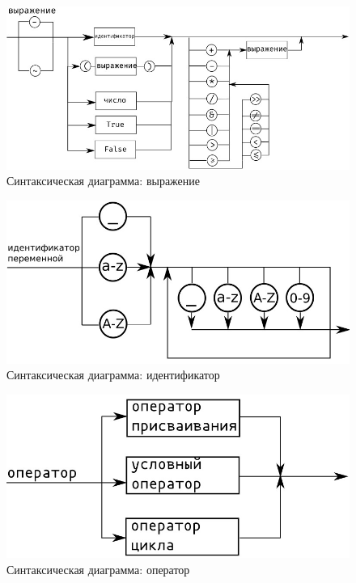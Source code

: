     \begin{figure}[h]
	\begin{center}
		\includegraphics[scale=0.9]{my_folder/images/virth/expr}
		\caption{Синтаксическая диаграмма: выражение}
	\end{center}
    \end{figure}

    \begin{figure}[H]
	\begin{center}
		\includegraphics[scale=0.7]{my_folder/images/virth/var}
		\caption{Синтаксическая диаграмма: идентификатор}
	\end{center}
    \end{figure}
    
    \begin{figure}[H]
	\begin{center}
		\includegraphics[scale=0.7]{my_folder/images/virth/op}
		\caption{Синтаксическая диаграмма: оператор}
	\end{center}
    \end{figure}
    
